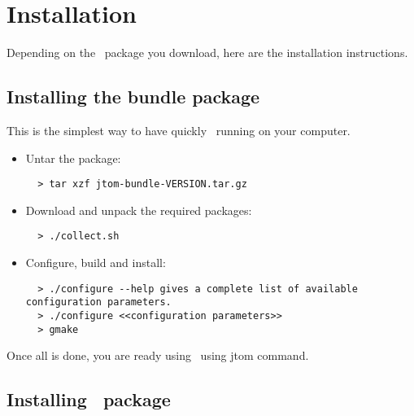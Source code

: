 \section{Installation}
Depending on the \TOM\ package you download, here are the installation
instructions.

\subsection{Installing the bundle package}
This is the simplest way to have quickly \TOM\ running on your
computer.
\begin{itemize}
\item Untar the package:
\begin{verbatim}
  > tar xzf jtom-bundle-VERSION.tar.gz
\end{verbatim}
\item Download and unpack the required packages:
\begin{verbatim}
  > ./collect.sh
\end{verbatim}
\item Configure, build and install:
\begin{verbatim}
  > ./configure --help gives a complete list of available configuration parameters.
  > ./configure <<configuration parameters>>
  > gmake
\end{verbatim}
\end{itemize}

Once all is done, you are ready using \TOM\ using jtom command.

\subsection{Installing \TOM\ package}

